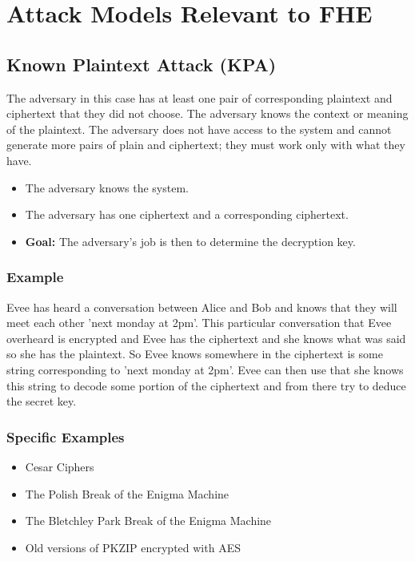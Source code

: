 \section*{Attack Models Relevant to FHE}

\subsection*{Known Plaintext Attack (KPA)}
The adversary in this case has at least one pair of corresponding plaintext and ciphertext that they did not choose.
The adversary knows the context or meaning of the plaintext.
The adversary does not have access to the system and cannot generate more pairs of plain and ciphertext; they must work only with what they have.
\bigskip

\begin{itemize}
\item The adversary knows the system.
\item The adversary has one ciphertext and a corresponding ciphertext.
\item \textbf{Goal:} The adversary’s job is then to determine the decryption key.
\end{itemize}
\bigskip

\subsubsection*{Example}
Evee has heard a conversation between Alice and Bob and knows that they will meet each other 'next monday at 2pm'.
\newline
This particular conversation that Evee overheard is encrypted and Evee has the ciphertext and she knows what was said so she has the plaintext. 
So Evee knows somewhere in the ciphertext is some string corresponding to 'next monday at 2pm'. 
\newline
Evee can then use that she knows this string to decode some portion of the ciphertext and from there try to deduce the secret key. 
\bigskip

\subsubsection*{Specific Examples}
\begin{itemize}
\item Cesar Ciphers
\item The Polish Break of the Enigma Machine
\item The Bletchley Park Break of the Enigma Machine
\item Old versions of PKZIP encrypted with AES
\end{itemize}

